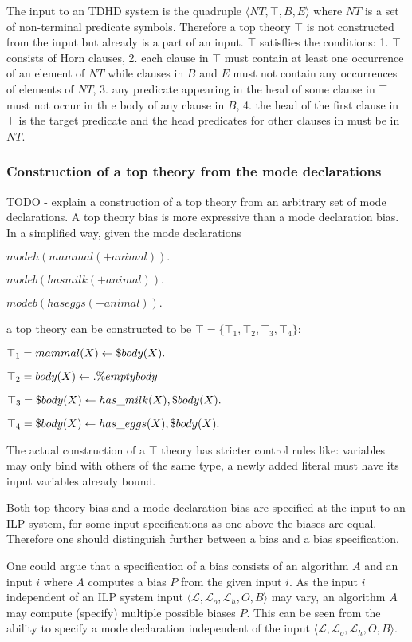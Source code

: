 The input to an TDHD system is the quadruple $\langle NT, \top, B, E \rangle$ where $NT$ is a set of non-terminal  predicate symbols. Therefore a top theory $\top$ is not constructed from the input but already is a part of an input. $\top$ satisflies the conditions:
1. $\top$ consists of Horn clauses,
2. each clause in $\top$
must contain at least one occurrence of an element of $NT$ while clauses in $B$
and $E$ must not contain any occurrences of elements of $NT$,
3. any predicate appearing in the head of some clause in $\top$ must not occur in th	e body of any clause in $B$,
4. the head of the first clause in $\top$ is the target predicate and
the head predicates for other clauses in must be in $NT$.

\subsubsection{Construction of a top theory from the mode declarations\cite{muggleton2008toplog}}
TODO - explain a construction of a top theory from an arbitrary set of mode declarations.
A top theory bias is more expressive than a mode declaration bias.
In a simplified way, given the mode declarations

$modeh(mammal(+animal)).$

$modeb(has milk(+animal)).$

$modeb(has eggs(+animal)).$

a top theory can be constructed to be $\top=\{\top_1, \top_2, \top_3, \top_4\}$:

$\top_1=mammal(X) \leftarrow \$body(X).$

$\top_2=body(X) \leftarrow .\%emptybody$

$\top_3=\$body(X) \leftarrow has\_milk(X), \$body(X).$

$\top_4=\$body(X) \leftarrow has\_eggs(X), \$body(X).$

The actual construction of a $\top$ theory has stricter control rules like: variables may only bind with others of the same type, a newly added literal must have its input variables already bound.

Both top theory bias and a mode declaration bias are specified at the input to an ILP system, for some input specifications as one above the biases are equal. Therefore one should distinguish further between a bias and a bias specification.

One could argue that a specification of a bias consists of an algorithm $A$ and an input $i$ where $A$ computes a bias $P$ from the given input $i$. As the input $i$ independent of an ILP system input $\langle\mathcal{L}, \mathcal{L}_o, \mathcal{L}_h, O, B\rangle$ may vary, an algorithm $A$ may compute (specify) multiple possible biases $P$. This can be seen from the ability to specify a mode declaration independent of the input
$\langle\mathcal{L}, \mathcal{L}_o, \mathcal{L}_h, O, B\rangle$.

